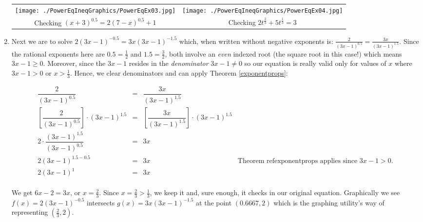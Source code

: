 \documentclass{ximera}
\begin{document}
\begin{example}
\begin{enumerate}
\begin{center}

\begin{tabular}{cc}

\texttt{[image: ./PowerEqIneqGraphics/PowerEqEx03.jpg]} & \texttt{[image: ./PowerEqIneqGraphics/PowerEqEx04.jpg]} \\

Checking $(x+3)^{0.5} = 2(7-x)^{0.5}+1$ & Checking  $2t^{\frac{2}{3}} + 5t^{\frac{1}{3}} = 3$ \\

\end{tabular}

\end{center} 


\item Next we are to solve $2(3x-1)^{-0.5}  = 3x (3x-1)^{-1.5}$ which, when written without negative exponents is: $\frac{2}{(3x-1)^{0.5}} = \frac{3x}{(3x-1)^{1.5}}$.  Since the rational exponents here are $0.5 = \frac{1}{2}$ and $1.5 = \frac{3}{2}$, both involve an \textit{even} indexed root (the square root in this case!) which means $3x-1 \geq 0$.  Moreover, since the $3x-1$ resides in the \textit{denominator} $3x - 1 \neq 0$ so our equation is really valid only for values of $x$ where $3x-1>0$ or $x > \frac{1}{3}$.  Hence, we clear denominators and can apply Theorem \ref{exponentprops}:

\[ \begin{array}{rclr}

\dfrac{2}{(3x-1)^{0.5}} & = & \dfrac{3x}{(3x-1)^{1.5}} & \\

\left[ \dfrac{2}{(3x-1)^{0.5}} \right] \cdot (3x-1)^{1.5} & = & \left[  \dfrac{3x}{(3x-1)^{1.5}} \right ] \cdot (3x-1)^{1.5} & \\

2 \cdot \dfrac{(3x-1)^{1.5}}{(3x-1)^{0.5}} & = & 3x & \\

2 (3x-1)^{1.5-0.5} & = & 3x & \text{Theorem ref{exponentprops} applies since $3x-1 > 0$.} \\

2 (3x-1)^{1} & = & 3x & \\  \end{array} \]

We get $6x-2 = 3x$, or $x = \frac{2}{3}$.  Since $x = \frac{2}{3} > \frac{1}{3}$, we keep it and, sure enough, it  checks in our original equation. Graphically we see $f(x)=2(3x-1)^{-0.5}$ intersects $g(x) = 3x (3x-1)^{-1.5}$ at the point $(0.6667, 2)$ which is the graphing utility's way of representing $\left(\frac{2}{3}, 2\right)$.


\end{enumerate}
\end{example}
\end{document}
